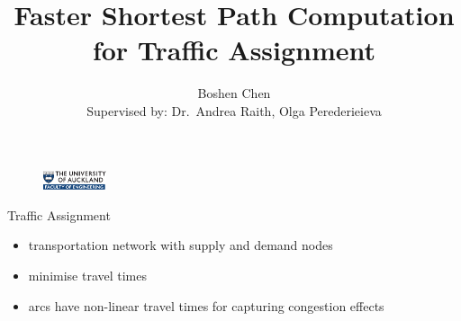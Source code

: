 \documentclass{beamer}
\author[Boshen Chen]{Boshen Chen \\{\small Supervised by: Dr.\ Andrea Raith, Olga Perederieieva}}
\title[Faster Shortest Path Computation for Traffic Assignment]{Faster Shortest Path Computation for Traffic Assignment}
\institute[UoA]{
    Department of Engineering Science\\
    University of Auckland\\
}
\date{}
\begin{document}
\begin{frame}[plain]
    \titlepage
    \begin{figure}
    \raggedleft
    \includegraphics[width=5em,keepaspectratio]{img/logo}
    \end{figure}
\end{frame}


\begin{frame}{Traffic Assignment}
    \begin{itemize}
        \item transportation network with supply and demand nodes
        \item minimise travel times
        \item arcs have \alert{non-linear} travel times for capturing \alert{congestion} effects
    \end{itemize}

\end{frame}
\end{document}
